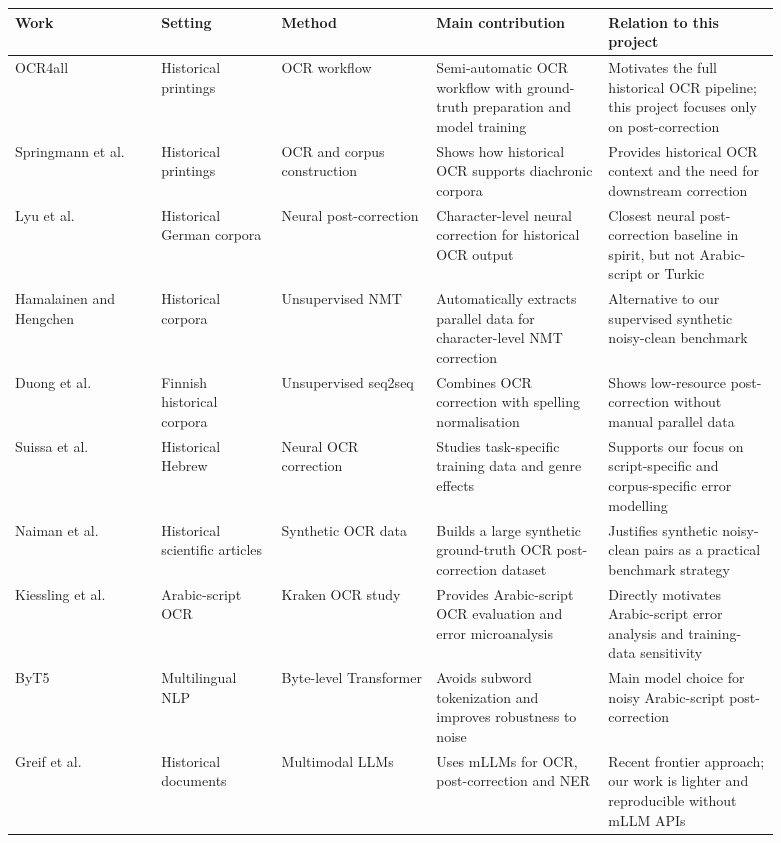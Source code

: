 
\begin{tabular}{p{0.17\linewidth}p{0.14\linewidth}p{0.18\linewidth}p{0.20\linewidth}p{0.20\linewidth}}
\toprule
Work & Setting & Method & Main contribution & Relation to this project \\
\midrule
OCR4all \cite{reul2019ocr4all} & Historical printings & OCR workflow & Semi-automatic OCR workflow with ground-truth preparation and model training & Motivates the full historical OCR pipeline; this project focuses only on post-correction \\
Springmann et al. \cite{springmann2018ocr} & Historical printings & OCR and corpus construction & Shows how historical OCR supports diachronic corpora & Provides historical OCR context and the need for downstream correction \\
Lyu et al. \cite{lyu2021neural} & Historical German corpora & Neural post-correction & Character-level neural correction for historical OCR output & Closest neural post-correction baseline in spirit, but not Arabic-script or Turkic \\
Hamalainen and Hengchen \cite{hamalainen2019paft} & Historical corpora & Unsupervised NMT & Automatically extracts parallel data for character-level NMT correction & Alternative to our supervised synthetic noisy-clean benchmark \\
Duong et al. \cite{duong2020unsupervised} & Finnish historical corpora & Unsupervised seq2seq & Combines OCR correction with spelling normalisation & Shows low-resource post-correction without manual parallel data \\
Suissa et al. \cite{suissa2023optimizing} & Historical Hebrew & Neural OCR correction & Studies task-specific training data and genre effects & Supports our focus on script-specific and corpus-specific error modelling \\
Naiman et al. \cite{naiman2023large} & Historical scientific articles & Synthetic OCR data & Builds a large synthetic ground-truth OCR post-correction dataset & Justifies synthetic noisy-clean pairs as a practical benchmark strategy \\
Kiessling et al. \cite{kiessling2024arabicocr} & Arabic-script OCR & Kraken OCR study & Provides Arabic-script OCR evaluation and error microanalysis & Directly motivates Arabic-script error analysis and training-data sensitivity \\
ByT5 \cite{xue2022byt5} & Multilingual NLP & Byte-level Transformer & Avoids subword tokenization and improves robustness to noise & Main model choice for noisy Arabic-script post-correction \\
Greif et al. \cite{greif2025multimodal} & Historical documents & Multimodal LLMs & Uses mLLMs for OCR, post-correction and NER & Recent frontier approach; our work is lighter and reproducible without mLLM APIs \\
\bottomrule
\end{tabular}
